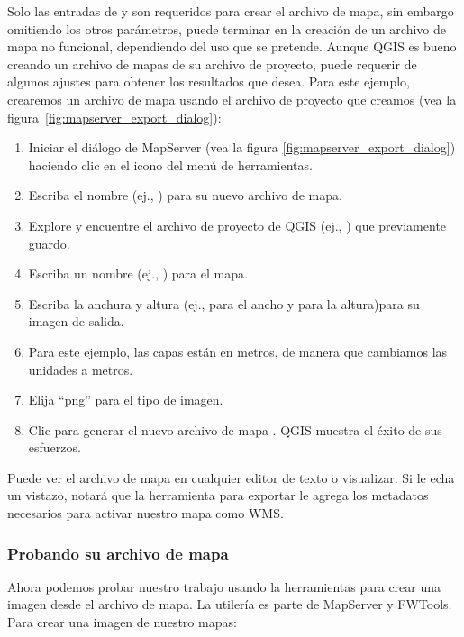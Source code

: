 Solo las entradas de  y  son 
requeridos para crear el archivo de mapa, sin embargo omitiendo los otros parámetros, 
puede terminar en la creación de un archivo de mapa no funcional, dependiendo del uso que se pretende. 
Aunque QGIS es bueno creando un archivo de mapas de su archivo de proyecto, 
puede requerir de algunos ajustes para obtener los resultados que desea. 
Para este ejemplo, crearemos un archivo de mapa usando el archivo de proyecto 
 que creamos
(vea la figura~\ref{fig:mapserver_export_dialog}):

\begin{enumerate}
  \item  Iniciar el diálogo de MapServer (vea la  
figura \ref{fig:mapserver_export_dialog}) haciendo clic en el icono  del menú de herramientas.
  \item Escriba el nombre (ej., ) para su nuevo archivo de mapa.
  \item Explore y encuentre el archivo de proyecto de QGIS (ej., ) 
  que previamente guardo.
  \item Escriba un nombre (ej., ) para el mapa.
  \item Escriba la anchura y altura (ej.,  para el ancho y  para la altura)para su imagen de salida.
  \item Para este ejemplo, las capas están en metros, de manera que cambiamos las unidades a metros.
  \item Elija ``png'' para el tipo de imagen.
  \item Clic  para generar el nuevo archivo de mapa . 
  QGIS muestra el éxito de sus esfuerzos.
\end{enumerate}

Puede ver el archivo de mapa en cualquier editor de texto o visualizar. Si le echa un vistazo,
notará que la herramienta para exportar le agrega los metadatos necesarios
para activar nuestro mapa como WMS. 

\subsubsection{Probando su archivo de mapa}

Ahora podemos probar nuestro trabajo usando la herramientas  para crear una imagen desde el archivo de mapa. La utilería  es parte de MapServer y FWTools. 
Para crear una imagen de nuestro mapas:

